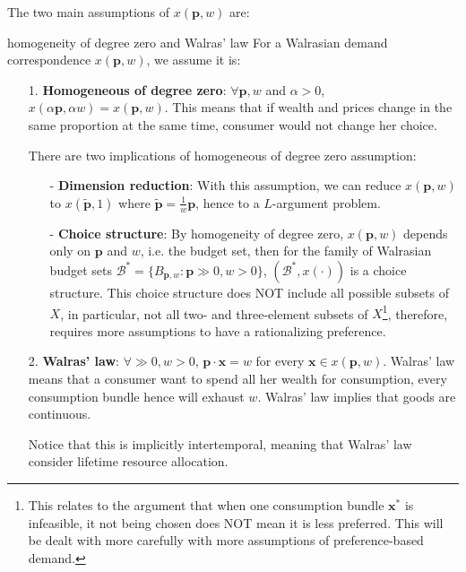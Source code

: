 The two main assumptions of $ x(\mathbf{p},w)$ are:
\begin{definition}{homogeneity of degree zero and Walras' law}{}
    For a Walrasian demand correspondence $ x(\mathbf{p},w)$, we assume it is:
    \begin{enumerate}
        \item[1.] \textbf{Homogeneous of degree zero}: $\forall \mathbf{p},w$ and $\alpha >0$, $ x(\alpha \mathbf{p},\alpha w)= x(\mathbf{p},w)$. This means that if wealth and prices change in the same proportion at the same time, consumer would not change her choice. 
        
        There are two implications of homogeneous of degree zero assumption:
        \begin{enumerate}
            \item[-] \textbf{Dimension reduction}: With this assumption, we can reduce $ x(\mathbf{p},w)$ to $ x(\tilde{\mathbf{p}},1)$ where $\tilde{\mathbf{p}}=\frac{1}{w}\mathbf{p}$, hence to a $L$-argument problem.
            \item[-] \textbf{Choice structure}: By homogeneity of degree zero, $ x(\mathbf{p},w)$ depends only on $\mathbf{p}$ and $w$, i.e. the budget set, then for the family of Walrasian budget sets $\mathcal{B}^*=\{B_{\mathbf{p},w}:\mathbf{p}\gg 0,w>0\}$, $(\mathcal{B}^*, x(\cdot))$ is a choice structure. This choice structure does NOT include all possible subsets of $X$, in particular, not all two- and three-element subsets of $X$\footnote{This relates to the argument that when one consumption bundle $\mathbf{x^*}$ is infeasible, it not being chosen does NOT mean it is less preferred. This will be dealt with more carefully with more assumptions of preference-based demand.}, therefore, requires more assumptions to have a rationalizing preference.
        \end{enumerate}
             
        \item[2.] \textbf{Walras' law}: $\forall \gg 0,w>0$, $\mathbf{p}\cdot\mathbf{x}=w$ for every $\mathbf{x}\in  x(\mathbf{p},w)$. Walras' law means that a consumer want to spend all her wealth for consumption, every consumption bundle hence will exhaust $w$. Walras' law implies that goods are continuous.
        
        Notice that this is implicitly intertemporal, meaning that Walras' law consider lifetime resource allocation.
    \end{enumerate}
\end{definition}

